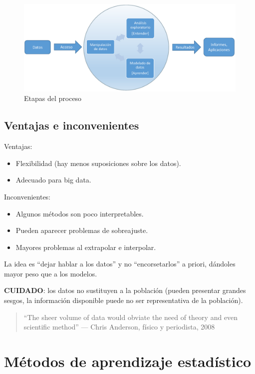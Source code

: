 \documentclass[]{book}
\begin{document}
\begin{figure}
\includegraphics[width=0.8\linewidth]{images/esquema2} \caption{Etapas del proceso}\label{fig:esquema}
\end{figure}

\hypertarget{ventajas-e-inconvenientes}{%
\subsection{Ventajas e inconvenientes}\label{ventajas-e-inconvenientes}}

Ventajas:

\begin{itemize}
\item
  Flexibilidad (hay menos suposiciones sobre los datos).
\item
  Adecuado para big data.
\end{itemize}

Inconvenientes:

\begin{itemize}
\item
  Algunos métodos son poco interpretables.
\item
  Pueden aparecer problemas de sobreajuste.
\item
  Mayores problemas al extrapolar e interpolar.
\end{itemize}

La idea es ``dejar hablar a los datos'' y no ``encorsetarlos'' a priori,
dándoles mayor peso que a los modelos.

\textbf{CUIDADO}: los datos no sustituyen a la población (pueden presentar grandes sesgos,
la información disponible puede no ser representativa de la población).

\begin{quote}
``The sheer volume of data would obviate the need of theory and even
scientific method''
--- Chris Anderson, físico y periodista, 2008
\end{quote}

\hypertarget{metodos-de-aprendizaje-estadistico}{%
\section{Métodos de aprendizaje estadístico}\label{metodos-de-aprendizaje-estadistico}}
\end{document}
